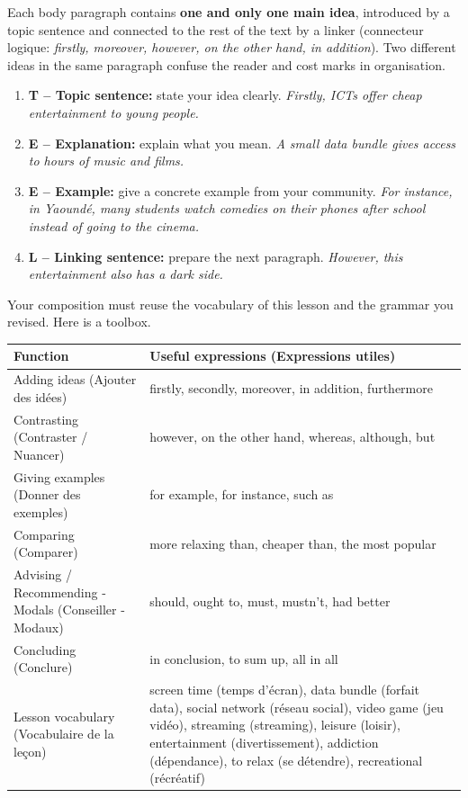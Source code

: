\documentclass[11pt]{article}
\newcommand{\cle}[1]{{\popxbold\color{popdark}#1}}
\newcounter{popsec}
\newcounter{popsub}
\newcommand{\courssub}[1]{%
  \stepcounter{popsub}%
  \par\vspace{9pt}\noindent{\popxbold\fontsize{11.5}{13}\selectfont\color{popink}{\color{poporange}\thepopsec.\thepopsub}\hspace{6pt}#1}\par\nopagebreak\vspace{4pt}
}
\begin{document}
\begin{propriete}
Each body paragraph contains \textbf{one and only one main idea}, introduced by a topic sentence and connected to the rest of the text by a \cle{linker} (connecteur logique: \emph{firstly, moreover, however, on the other hand, in addition}). Two different ideas in the same paragraph confuse the reader and cost marks in organisation.
\end{propriete}

\begin{methode}
\begin{enumerate}
\item \textbf{T -- Topic sentence:} state your idea clearly. \emph{Firstly, ICTs offer cheap entertainment to young people.}
\item \textbf{E -- Explanation:} explain what you mean. \emph{A small data bundle gives access to hours of music and films.}
\item \textbf{E -- Example:} give a concrete example from your community. \emph{For instance, in Yaoundé, many students watch comedies on their phones after school instead of going to the cinema.}
\item \textbf{L -- Linking sentence:} prepare the next paragraph. \emph{However, this entertainment also has a dark side.}
\end{enumerate}
\end{methode}

\courssub{Using lesson vocabulary and grammar}

Your composition must reuse the vocabulary of this lesson and the grammar you revised. Here is a toolbox.

\begin{center}
\begin{tabularx}{\linewidth}{|l|X|}
\hline
\rowcolor{popblueL} \textbf{Function} & \textbf{Useful expressions (Expressions utiles)} \\
\hline
Adding ideas (Ajouter des idées) & firstly, secondly, moreover, in addition, furthermore \\
\hline
Contrasting (Contraster / Nuancer) & however, on the other hand, whereas, although, but \\
\hline
Giving examples (Donner des exemples) & for example, for instance, such as \\
\hline
Comparing (Comparer) & more relaxing than, cheaper than, the most popular \\
\hline
Advising / Recommending - Modals (Conseiller - Modaux) & should, ought to, must, mustn't, had better \\
\hline
Concluding (Conclure) & in conclusion, to sum up, all in all \\
\hline
Lesson vocabulary (Vocabulaire de la leçon) & screen time (temps d'écran), data bundle (forfait data), social network (réseau social), video game (jeu vidéo), streaming (streaming), leisure (loisir), entertainment (divertissement), addiction (dépendance), to relax (se détendre), recreational (récréatif) \\
\hline
\end{tabularx}
\end{center}
\end{document}

